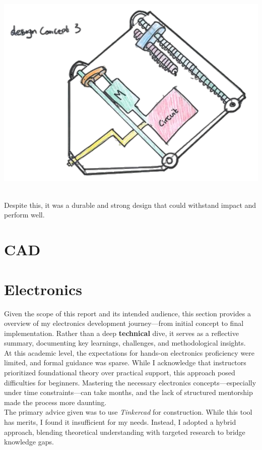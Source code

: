 \documentclass{article}
\begin{document}
\begin{minipage}{0.4\textwidth}
	\centering
	\includegraphics[width=1\textwidth]{images/image_8_2-Photoroom.png}
\end{minipage}\\[8pt]
Despite this, it was a durable and strong design that could withstand impact and perform well.

\newpage\restoregeometry
\section{CAD}


\newpage{}
\section{Electronics}
Given the scope of this report and its intended audience, this section provides a overview of my electronics development journey---from initial concept to final implementation. Rather than a deep \textbf{technical} dive, it serves as a reflective summary, documenting key learnings, challenges, and methodological insights.\\[8pt]
At this academic level, the expectations for hands-on electronics proficiency were limited, and formal guidance was sparse. While I acknowledge that instructors prioritized foundational theory over practical support, this approach posed difficulties for beginners. Mastering the necessary electronics concepts---especially under time constraints---can take months, and the lack of structured mentorship made the process more daunting.\\[8pt]
The primary advice given was to use \textit{Tinkercad} for construction. While this tool has merits, I found it insufficient for my needs. Instead, I adopted a hybrid approach, blending theoretical understanding with targeted research to bridge knowledge gaps.
\end{document}
